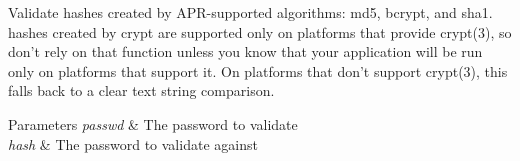 Validate hashes created by A\-P\-R-\/supported algorithms\-: md5, bcrypt, and sha1. hashes created by crypt are supported only on platforms that provide crypt(3), so don't rely on that function unless you know that your application will be run only on platforms that support it. On platforms that don't support crypt(3), this falls back to a clear text string comparison. 
\begin{DoxyParams}{Parameters}
{\em passwd} & The password to validate \\
\hline
{\em hash} & The password to validate against \\
\hline
\end{DoxyParams}
